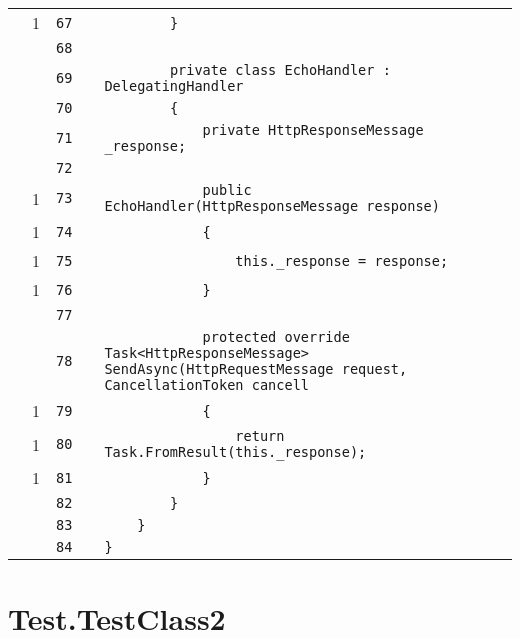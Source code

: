 \documentclass[a4paper,landscape,10pt]{article}
\begin{document}
\begin{longtable}[l]{lrrll}
\cellcolor{green} & 1 & \verb~67~ & & \verb~        }~\\
\cellcolor{gray} &  & \verb~68~ & & \verb~~\\
\cellcolor{gray} &  & \verb~69~ & & \verb~        private class EchoHandler : DelegatingHandler~\\
\cellcolor{gray} &  & \verb~70~ & & \verb~        {~\\
\cellcolor{gray} &  & \verb~71~ & & \verb~            private HttpResponseMessage _response;~\\
\cellcolor{gray} &  & \verb~72~ & & \verb~~\\
\cellcolor{green} & 1 & \verb~73~ & & \verb~            public EchoHandler(HttpResponseMessage response)~\\
\cellcolor{green} & 1 & \verb~74~ & & \verb~            {~\\
\cellcolor{green} & 1 & \verb~75~ & & \verb~                this._response = response;~\\
\cellcolor{green} & 1 & \verb~76~ & & \verb~            }~\\
\cellcolor{gray} &  & \verb~77~ & & \verb~~\\
\cellcolor{gray} &  & \verb~78~ & & \verb~            protected override Task<HttpResponseMessage> SendAsync(HttpRequestMessage request, CancellationToken cancell~\\
\cellcolor{green} & 1 & \verb~79~ & & \verb~            {~\\
\cellcolor{green} & 1 & \verb~80~ & & \verb~                return Task.FromResult(this._response);~\\
\cellcolor{green} & 1 & \verb~81~ & & \verb~            }~\\
\cellcolor{gray} &  & \verb~82~ & & \verb~        }~\\
\cellcolor{gray} &  & \verb~83~ & & \verb~    }~\\
\cellcolor{gray} &  & \verb~84~ & & \verb~}~\\
\end{longtable}
\newpage
\section{Test.TestClass2}
\end{document}
